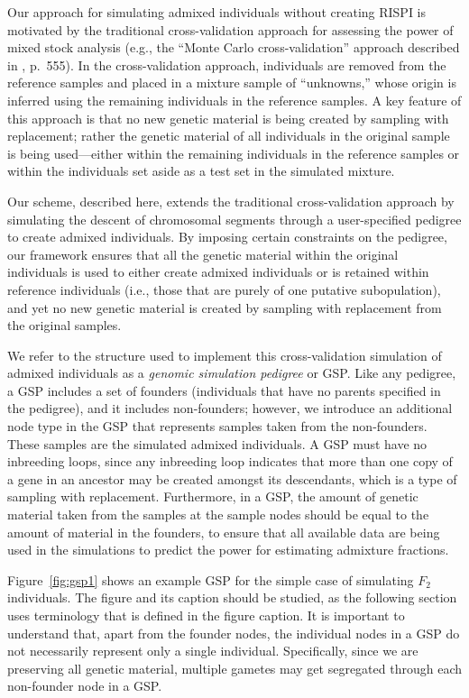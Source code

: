 Our approach for simulating admixed individuals without creating RISPI is motivated by the traditional cross-validation
approach for assessing the power of mixed stock analysis (e.g., the ``Monte Carlo cross-validation'' approach
described in \citealt{moran2019bayesian}, p.~555).
In the cross-validation approach, individuals are removed from the reference
samples and placed in a mixture sample of ``unknowns,'' whose origin
is inferred using the remaining individuals in the reference samples.  A key
feature of this approach is that no new genetic material is being created by
sampling with replacement; rather the genetic material of all individuals
in the original sample is being used---either within the remaining individuals in the
reference samples or within the individuals set aside as a test set in the
simulated mixture.

Our scheme, described here, extends the traditional cross-validation approach
by simulating the descent of chromosomal segments through a user-specified
pedigree to create admixed individuals.  By imposing certain constraints
on the pedigree, our framework ensures that all the genetic material
within the original individuals is used to either create admixed individuals or is retained
within reference individuals (i.e., those that are purely of one
putative subopulation), and yet no new genetic material is
created by sampling with replacement from the original samples.

We refer to the structure used to implement this cross-validation simulation
of admixed individuals as
a {\em genomic simulation pedigree} or GSP.  Like any pedigree,
a GSP includes a set of founders (individuals that have no parents specified in the
pedigree), and it includes non-founders; however, we introduce an additional node
type in the GSP that represents samples taken from the non-founders. These samples
are the simulated admixed individuals.  A GSP must have no inbreeding loops, since
any inbreeding loop indicates that more than one copy of a gene in an ancestor may
be created amongst its descendants, which is a type of sampling with
replacement.  Furthermore, in a GSP, the amount of genetic material taken from the
samples at the sample nodes should be equal to the amount of material in the founders,
to ensure that all available data are being used in the simulations to predict the power for
estimating admixture fractions.

Figure~\ref{fig:gsp1} shows an example GSP for the simple case
of simulating $F_2$ individuals. The figure and its caption
should be studied, as the following section
uses terminology that is defined in the figure caption.
It is important to understand that, apart from the founder nodes, the individual
nodes in a GSP do not necessarily represent only a single individual.  Specifically,
since we are preserving all genetic material, multiple gametes may get segregated
through each non-founder node in a GSP\@.

